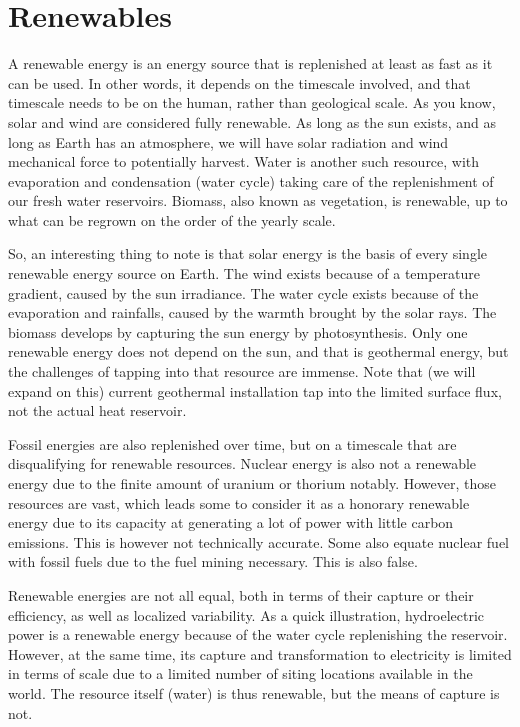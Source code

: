 \setchapterpreamble[u]{\margintoc}
\chapter{Renewables}

A renewable energy is an energy source that is replenished at least as fast as it can be used. In other words, it depends on the timescale involved, and that timescale needs to be on the human, rather than geological scale. As you know, solar and wind are considered fully renewable. As long as the sun exists, and as long as Earth has an atmosphere, we will have solar radiation and wind mechanical force to potentially harvest. Water is another such resource, with evaporation and condensation (water cycle) taking care of the replenishment of our fresh water reservoirs. Biomass, also known as vegetation, is renewable, up to what can be regrown on the order of the yearly scale.

So, an interesting thing to note is that solar energy is the basis of every single renewable energy source on Earth. The wind exists because of a temperature gradient, caused by the sun irradiance. The water cycle exists because of the evaporation and rainfalls, caused by the warmth brought by the solar rays. The biomass develops by capturing the sun energy by photosynthesis. Only one renewable energy does not depend on the sun, and that is geothermal energy, but the challenges of tapping into that resource are immense. Note that (we will expand on this) current geothermal installation tap into the limited surface flux, not the actual heat reservoir.

Fossil energies are also replenished over time, but on a timescale that are disqualifying for renewable resources. Nuclear energy is also not a renewable energy due to the finite amount of uranium or thorium notably. However, those resources are vast, which leads some to consider it as a honorary renewable energy due to its capacity at generating a lot of power with little carbon emissions. This is however not technically accurate. Some also equate nuclear fuel with fossil fuels due to the fuel mining necessary. This is also false.

Renewable energies are not all equal, both in terms of their capture or their efficiency, as well as localized variability. As a quick illustration, hydroelectric power is a renewable energy because of the water cycle replenishing the reservoir. However, at the same time, its capture and transformation to electricity is limited in terms of scale due to a limited number of siting locations available in the world. The resource itself (water) is thus renewable, but the means of capture is not.

